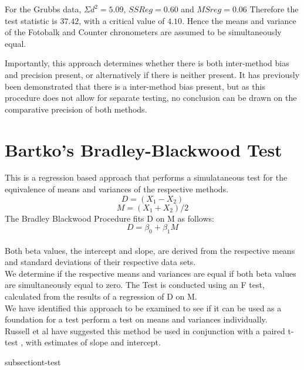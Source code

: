 \documentclass[12pt, a4paper]{report}
\theoremstyle{plain}
\theoremstyle{definition}
\theoremstyle{remark}
\begin{document}
	For the Grubbs data, $\Sigma d^{2}=5.09 $, $SSReg = 0.60$ and
	$MSreg=0.06$ Therefore the test statistic is $37.42$, with a
	critical value of $4.10$. Hence the means and variance of the
	Fotobalk and Counter chronometers are assumed to be simultaneously
	equal.
	
	Importantly, this approach determines whether there is both
	inter-method bias and precision present, or alternatively if there
	is neither present. It has previously been demonstrated that there
	is a inter-method bias present, but as this procedure does not
	allow for separate testing, no conclusion can be drawn on the
	comparative precision of both methods.
	
	\section{Bartko's Bradley-Blackwood Test}
	This is a regression based approach that performs a simulataneous
	test for the equivalence of means and variances of the respective
	methods.\\
	\begin{equation}
	D = (X_{1}-X_{2})
	\end{equation}
	\begin{equation}
	M = (X_{1} + X_{2}) /2
	\end{equation}
	The Bradley Blackwood Procedure fits D on M as follows:\\
	\begin{equation}
	D = \beta_{0} + \beta_{1}M
	\end{equation}
	\\Both beta values, the intercept and slope, are derived from the respective means and
	standard deviations of their respective data sets.\\
	We determine if the respective means and variances are equal if
	both beta values are simultaneously equal to zero. The Test is
	conducted using an F test, calculated from the results of a
	regression of D on M.
	\\We have identified this approach  to be examined to see if it can
	be used as a foundation for a test perform a test on means and
	variances individually.\\
	Russell et al have suggested this method be used in conjunction
	with a paired t-test , with estimates of slope and intercept.
	
	subsection{t-test}
	
\end{document}
